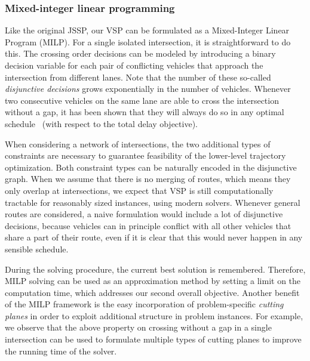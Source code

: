 \documentclass{article}
\theoremstyle{definition}
\theoremstyle{plain}
\begin{document}

\subsubsection{Mixed-integer linear programming}

Like the original JSSP, our VSP can be formulated as a Mixed-Integer Linear
Program (MILP).
For a single isolated intersection, it is straightforward to do this. The
crossing order decisions can be modeled by introducing a binary decision
variable for each pair of conflicting vehicles that approach the intersection
from different lanes. Note that the number of these so-called
\textit{disjunctive decisions} grows exponentially in the number of vehicles.
Whenever two consecutive vehicles on the same lane are able to cross the
intersection without a gap, it has been shown that they will always do so in any
optimal schedule~\cite{limpensOnlinePlatoonForming2023} (with respect to the
total delay objective).

When considering a network of intersections, the two additional types of constraints
are necessary to guarantee feasibility of the lower-level trajectory
optimization.
Both constraint types can be naturally encoded in the disjunctive graph.
%
When we assume that there is no merging of routes, which means they only overlap
at intersections, we expect that VSP is still computationally tractable for
reasonably sized instances, using modern solvers. Whenever general routes
are considered, a naive formulation would include a lot of disjunctive
decisions, because vehicles can in principle conflict with all other vehicles
that share a part of their route, even if it is clear that this would never
happen in any sensible schedule.

During the solving procedure, the current best solution is remembered.
Therefore, MILP solving can be used as an approximation method by setting a
limit on the computation time, which addresses our second overall objective.
%
Another benefit of the MILP framework is the easy incorporation of
problem-specific \textit{cutting planes} in order to exploit additional
structure in problem instances. For example, we observe that the above property
on crossing without a gap in a single intersection can be used to formulate
multiple types of cutting planes to improve the running time of the solver.
\end{document}
